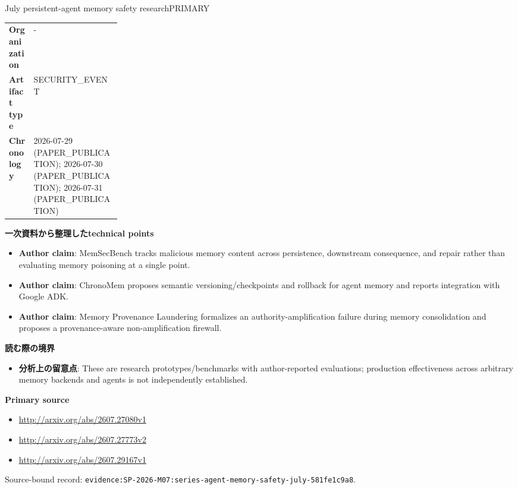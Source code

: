 \begin{technicalnote}{July persistent-agent memory safety research}{PRIMARY}
\begin{tabularx}{\linewidth}{@{}>{\bfseries}p{0.22\linewidth}X@{}}
Organization & - \\
Artifact type & SECURITY\_EVENT \\
Chronology & 2026-07-29 (PAPER\_PUBLICATION); 2026-07-30 (PAPER\_PUBLICATION); 2026-07-31 (PAPER\_PUBLICATION) \\
\end{tabularx}
\smallskip
{\bfseries 一次資料から整理したtechnical points}
\begin{itemize}[leftmargin=1.5em,itemsep=0.35em]
\item \textbf{Author claim}: MemSecBench tracks malicious memory content across persistence, downstream consequence, and repair rather than evaluating memory poisoning at a single point.
\item \textbf{Author claim}: ChronoMem proposes semantic versioning/checkpoints and rollback for agent memory and reports integration with Google ADK.
\item \textbf{Author claim}: Memory Provenance Laundering formalizes an authority-amplification failure during memory consolidation and proposes a provenance-aware non-amplification firewall.
\end{itemize}
{\bfseries 読む際の境界}
\begin{itemize}[leftmargin=1.5em,itemsep=0.35em]
\item \textbf{分析上の留意点}: These are research prototypes/benchmarks with author-reported evaluations; production effectiveness across arbitrary memory backends and agents is not independently established.
\end{itemize}
{\bfseries Primary source}
\begin{itemize}[leftmargin=1.5em,itemsep=0.25em]
\item \url{http://arxiv.org/abs/2607.27080v1}
\item \url{http://arxiv.org/abs/2607.27773v2}
\item \url{http://arxiv.org/abs/2607.29167v1}
\end{itemize}
{\scriptsize\color{SurveyMuted}Source-bound record: \texttt{evidence:SP-2026-M07:series-agent-memory-safety-july-581fe1c9a8}.}
\end{technicalnote}
\medskip
